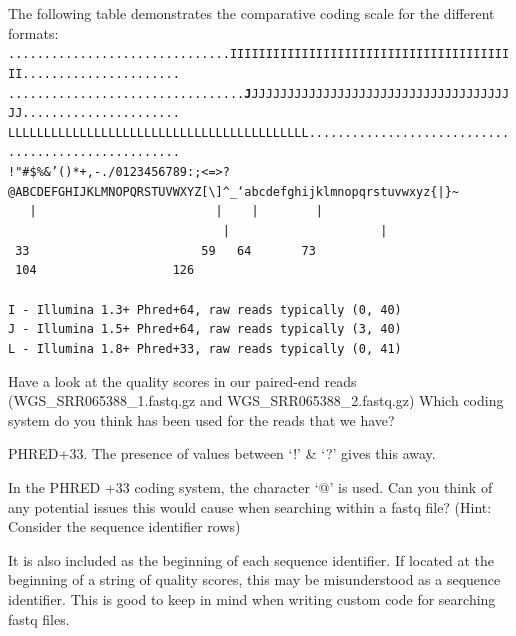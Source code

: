 \begin{minipage}{\textwidth}

The following table demonstrates the comparative coding scale for the different formats: \\

\scriptsize
\texttt{...............................IIIIIIIIIIIIIIIIIIIIIIIIIIIIIIIIIIIIIIIII...................... \\
.................................\textbf{J}JJJJJJJJJJJJJJJJJJJJJJJJJJJJJJJJJJJJJJ...................... \\
LLLLLLLLLLLLLLLLLLLLLLLLLLLLLLLLLLLLLLLLLL.................................................... \\
!"\#\$\%\&'()*+,-./0123456789:;\textless =\textgreater?@ABCDEFGHIJKLMNOPQRSTUVWXYZ[\textbackslash]\^{}\_`abcdefghijklmnopqrstuvwxyz\{|\}\~{}} \\
\texttt{
~~|~~~~~~~~~~~~~~~~~~~~~~~~~|~~~~|~~~~~~~~|~~~~~~~~~~~~~~~~~~~~~~~~~~~~~~|~~~~~~~~~~~~~~~~~~~~~|~\\
~33~~~~~~~~~~~~~~~~~~~~~~~~59~~~64~~~~~~~73~~~~~~~~~~~~~~~~~~~~~~~~~~~~104~~~~~~~~~~~~~~~~~~~126~\\
~ \\
I - Illumina 1.3+ Phred+64,  raw reads typically (0, 40) \\
J - Illumina 1.5+ Phred+64,  raw reads typically (3, 40) \\
L - Illumina 1.8+ Phred+33,  raw reads typically (0, 41) \\
}
\end{minipage}

\begin{questions}
Have a look at the quality scores in our paired-end reads (WGS_SRR065388_1.fastq.gz and WGS_SRR065388_2.fastq.gz)
Which coding system do you think has been used for the reads that we have? \\
\begin{answer}
PHRED+33.
The presence of values between `!' \& `?' gives this away.\\
\end{answer}
In the PHRED +33 coding system, the character `@' is used.
Can you think of any potential issues this would cause when searching within a fastq file?
(Hint: Consider the sequence identifier rows)\\
\begin{answer}
It is also included as the beginning of each sequence identifier.
If located at the beginning of a string of quality scores, this may be misunderstood as a sequence identifier.
This is good to keep in mind when writing custom code for searching fastq files.
\end{answer}
\end{questions}

